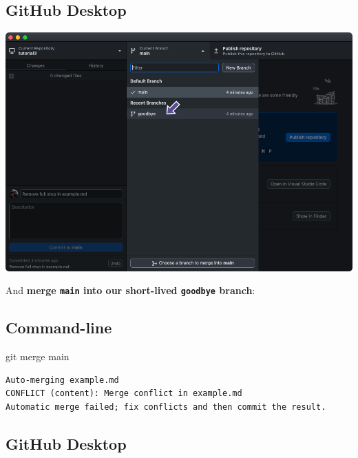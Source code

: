 \documentclass[
  letterpaper,
  DIV=11,
  numbers=noendperiod]{scrartcl}
\newenvironment{Shaded}{\begin{snugshade}}{\end{snugshade}}
\newcommand{\NormalTok}[1]{\textcolor[rgb]{0.00,0.23,0.31}{#1}}
\begin{document}
\subsection{GitHub Desktop}

\includegraphics{images/image65.png}

And \textbf{merge \texttt{main} into our short-lived \texttt{goodbye}
branch}:

\subsection{Command-line}

\begin{Shaded}
\begin{Highlighting}[]
\NormalTok{git merge main}
\end{Highlighting}
\end{Shaded}

\begin{verbatim}
Auto-merging example.md
CONFLICT (content): Merge conflict in example.md
Automatic merge failed; fix conflicts and then commit the result.
\end{verbatim}

\subsection{GitHub Desktop}
\end{document}
